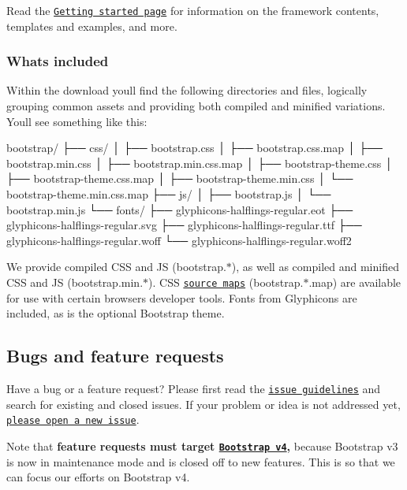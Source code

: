 Read the \href{http://getbootstrap.com/getting-started/}{\tt Getting started page} for information on the framework contents, templates and examples, and more.

\subsubsection*{What\textquotesingle{}s included}

Within the download you\textquotesingle{}ll find the following directories and files, logically grouping common assets and providing both compiled and minified variations. You\textquotesingle{}ll see something like this\+:


\begin{DoxyCode}
bootstrap/
├── css/
│   ├── bootstrap.css
│   ├── bootstrap.css.map
│   ├── bootstrap.min.css
│   ├── bootstrap.min.css.map
│   ├── bootstrap-theme.css
│   ├── bootstrap-theme.css.map
│   ├── bootstrap-theme.min.css
│   └── bootstrap-theme.min.css.map
├── js/
│   ├── bootstrap.js
│   └── bootstrap.min.js
└── fonts/
    ├── glyphicons-halflings-regular.eot
    ├── glyphicons-halflings-regular.svg
    ├── glyphicons-halflings-regular.ttf
    ├── glyphicons-halflings-regular.woff
    └── glyphicons-halflings-regular.woff2
\end{DoxyCode}


We provide compiled C\+SS and JS ({\ttfamily bootstrap.$\ast$}), as well as compiled and minified C\+SS and JS ({\ttfamily bootstrap.\+min.$\ast$}). C\+SS \href{https://developer.chrome.com/devtools/docs/css-preprocessors}{\tt source maps} ({\ttfamily bootstrap.$\ast$.map}) are available for use with certain browsers\textquotesingle{} developer tools. Fonts from Glyphicons are included, as is the optional Bootstrap theme.

\subsection*{Bugs and feature requests}

Have a bug or a feature request? Please first read the \href{https://github.com/twbs/bootstrap/blob/master/CONTRIBUTING.md#using-the-issue-tracker}{\tt issue guidelines} and search for existing and closed issues. If your problem or idea is not addressed yet, \href{https://github.com/twbs/bootstrap/issues/new}{\tt please open a new issue}.

Note that {\bfseries feature requests must target \href{https://github.com/twbs/bootstrap/tree/v4-dev}{\tt Bootstrap v4},} because Bootstrap v3 is now in maintenance mode and is closed off to new features. This is so that we can focus our efforts on Bootstrap v4.


